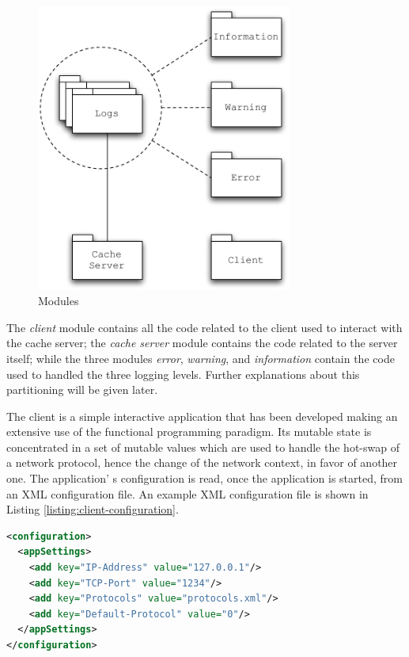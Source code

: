 \documentclass[11pt,a4paper]{article}
\begin{document}
\begin{figure}
\begin{center}
\includegraphics[width=0.75\textwidth]{figures/Modules.pdf}
\caption{Modules}
\label{figure:modules}
\end{center}
\end{figure}

The \emph{client} module contains all the code related to the client used to interact with the cache server; the \emph{cache server} module contains the code related to the server itself; while the three modules \emph{error}, \emph{warning}, and \emph{information} contain the code used to handled the three logging levels. Further explanations about this partitioning will be given later.

The client is a simple interactive application that has been developed making an extensive use of the functional programming paradigm. Its mutable state is concentrated in a set of mutable values which are used to handle the hot-swap of a network protocol, hence the change of the network context, in favor of another one. The application' s configuration is read, once the application is started, from an XML configuration file.  An example XML configuration file is shown in Listing \ref{listing:client-configuration}.

\begin{lstlisting}[language=XML,caption=Client XML configuration file,label=listing:client-configuration,float]
<configuration>
  <appSettings>
    <add key="IP-Address" value="127.0.0.1"/>
    <add key="TCP-Port" value="1234"/>
    <add key="Protocols" value="protocols.xml"/>
    <add key="Default-Protocol" value="0"/>
  </appSettings>
</configuration>
\end{lstlisting}
\end{document}
